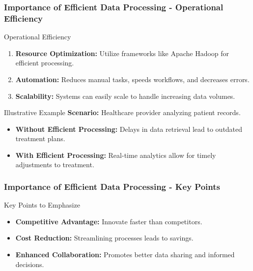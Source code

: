 \documentclass[aspectratio=169]{beamer}
\begin{document}
\begin{frame}[fragile]
    \frametitle{Importance of Efficient Data Processing - Operational Efficiency}
    \begin{block}{Operational Efficiency}
        \begin{enumerate}
            \item \textbf{Resource Optimization:} Utilize frameworks like Apache Hadoop for efficient processing.
            \item \textbf{Automation:} Reduces manual tasks, speeds workflows, and decreases errors.
            \item \textbf{Scalability:} Systems can easily scale to handle increasing data volumes.
        \end{enumerate}  
    \end{block}
    \begin{block}{Illustrative Example}
        \textbf{Scenario:} Healthcare provider analyzing patient records.
        \begin{itemize}
            \item \textbf{Without Efficient Processing:} Delays in data retrieval lead to outdated treatment plans.
            \item \textbf{With Efficient Processing:} Real-time analytics allow for timely adjustments to treatment. 
        \end{itemize}
    \end{block}
\end{frame}

\begin{frame}[fragile]
    \frametitle{Importance of Efficient Data Processing - Key Points}
    \begin{block}{Key Points to Emphasize}
        \begin{itemize}
            \item \textbf{Competitive Advantage:} Innovate faster than competitors.
            \item \textbf{Cost Reduction:} Streamlining processes leads to savings.
            \item \textbf{Enhanced Collaboration:} Promotes better data sharing and informed decisions.
        \end{itemize}
    \end{block}
\end{frame}
\end{document}
